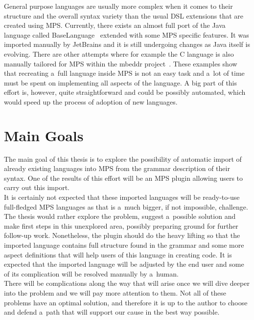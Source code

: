 General purpose languages are usually more complex when it comes to their structure and the overall syntax variety than the usual DSL extensions that are created using MPS.
Currently, there exists an almost full port of the Java language called BaseLanguage~\cite{BaseLanguage} extended with some MPS specific features.
It was imported manually by JetBrains and it is still undergoing changes as Java itself is evolving.
There are other attempts where for example the C language is also manually tailored for MPS within the mbeddr project~\cite{mbeddr}.
These examples show that recreating a~full language inside MPS is not an easy task and a~lot of time must be spent on implementing all aspects of the language.
A big part of this effort is, however, quite straightforward and could be possibly automated, which would speed up the process of adoption of new languages.

\section{Main Goals}
\label{chap:main_goals}

The main goal of this thesis is to explore the possibility of automatic import of already existing languages into MPS from the grammar description of their syntax.
One of the results of this effort will be an MPS plugin allowing users to carry out this import.
\\

It is certainly not expected that these imported languages will be ready-to-use full-fledged MPS languages as that is a~much bigger, if not impossible, challenge.
The thesis would rather explore the problem, suggest a~possible solution and make first steps in this unexplored area, possibly preparing ground for further follow-up work.
Nonetheless, the plugin should do the heavy lifting so that the imported language contains full structure found in the grammar and some more aspect definitions that will help users of this language in creating code.
It is expected that the imported language will be adjusted by the end user and some of its complication will be resolved manually by a~human.
\\

There will be complications along the way that will arise once we will dive deeper into the problem and we will pay more attention to them.
Not all of these problems have an optimal solution, and therefore it is up to the author to choose and defend a~path that will support our cause in the best way possible.
\\

